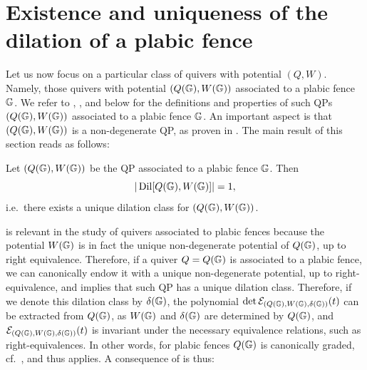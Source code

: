 \section{Existence and uniqueness of the dilation of a plabic fence}\label{sec:dilation_plabic_fence}

Let us now focus on a particular class of quivers with potential $(Q,W)$. Namely, those quivers with potential $(Q(\mathbb G),W(\mathbb G))$ associated to a plabic fence $\mathbb G$. We refer to \cite[Section 12]{FPST}, \cite[Def.~3.1 \& Sect.~3.2]{CasalsGao}, and  below for the definitions and properties of such QPs $(Q(\mathbb G),W(\mathbb G))$ associated to a plabic fence $\mathbb G$. An important aspect is that $(Q(\mathbb G),W(\mathbb G))$ is a non-degenerate QP, as proven in \cite[Prop.~3.7\&3.11]{CasalsGao}. The main result of this section reads as follows:

\begin{theorem}\label{thm:unique-fence-G1} Let $(Q(\mathbb G),W(\mathbb G))$ be the QP associated to a plabic fence $\mathbb G$. Then
$$|\operatorname{Dil}[Q(\mathbb G),W(\mathbb G)]|=1,$$
i.e.~there exists a unique dilation class for $(Q(\mathbb G),W(\mathbb G))$.
\end{theorem}

 is relevant in the study of quivers associated to plabic fences because the potential $W(\mathbb G)$ is in fact the unique non-degenerate potential of $Q(\mathbb G)$, up to right equivalence. Therefore, if a quiver $Q=Q(\mathbb G)$ is associated to a plabic fence, we can canonically endow it with a unique non-degenerate potential, up to right-equivalence, and  implies that such QP has a unique dilation class. Therefore, if we denote this dilation class by $\delta(\mathbb G)$, the polynomial $\det\mathcal E_{(Q(\mathbb G),W(\mathbb G),\delta(\mathbb G))}(t)$ can be extracted from $Q(\mathbb G)$, as $W(\mathbb G)$ and $\delta(\mathbb G)$ are determined by $Q(\mathbb G)$, and $\mathcal E_{(Q(\mathbb G),W(\mathbb G),\delta(\mathbb G))}(t)$ is invariant under the necessary equivalence relations, such as right-equivalences. In other words, for plabic fences $Q(\mathbb G)$ is canonically graded, cf.~, and thus  applies. A consequence of  is thus:

